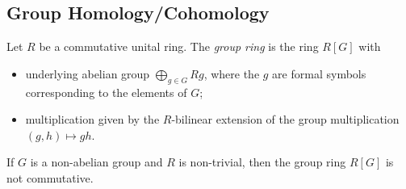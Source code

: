 \documentclass[10pt]{mypackage}
\begin{document}
\subsection{Group Homology/Cohomology}%
\begin{definition}
  Let $R$ be a commutative unital ring. The \textit{group ring} is the ring $R[G]$ with
  \begin{itemize}
    \item underlying abelian group $\bigoplus_{g\in G}Rg$, where the $g$ are formal symbols corresponding to the elements of $G$;
    \item multiplication given by the $R$-bilinear extension of the group multiplication $\left( g,h \right)\mapsto gh$.
  \end{itemize}
\end{definition}
If $G$ is a non-abelian group and $R$ is non-trivial, then the group ring $R[G]$ is not commutative.
\end{document}
